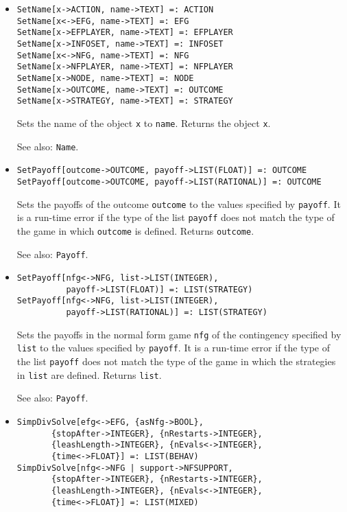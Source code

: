 \begin{itemize}
\item
\protect \large \begin{verbatim}
SetName[x->ACTION, name->TEXT] =: ACTION
SetName[x<->EFG, name->TEXT] =: EFG
SetName[x->EFPLAYER, name->TEXT] =: EFPLAYER
SetName[x->INFOSET, name->TEXT] =: INFOSET
SetName[x<->NFG, name->TEXT] =: NFG
SetName[x->NFPLAYER, name->TEXT] =: NFPLAYER
SetName[x->NODE, name->TEXT] =: NODE
SetName[x->OUTCOME, name->TEXT] =: OUTCOME
SetName[x->STRATEGY, name->TEXT] =: STRATEGY
\end{verbatim}\normalsize

\bd
Sets the name of the object \verb+x+ to \verb+name+.
Returns the object \verb+x+.
\item
[See also:] {\tt Name}.
\ed

\item
\protect \large \begin{verbatim}
SetPayoff[outcome->OUTCOME, payoff->LIST(FLOAT)] =: OUTCOME
SetPayoff[outcome->OUTCOME, payoff->LIST(RATIONAL)] =: OUTCOME
\end{verbatim}\normalsize

\bd
Sets the payoffs of the outcome \verb+outcome+ to the
values specified by \verb+payoff+.  It is a run-time error if the type
of the list \verb+payoff+ does not match the type of the game in which
\verb+outcome+ is defined.  Returns \verb+outcome+.
\item
[See also:] {\tt Payoff}.
\ed

\item
\protect \large \begin{verbatim}
SetPayoff[nfg<->NFG, list->LIST(INTEGER),
          payoff->LIST(FLOAT)] =: LIST(STRATEGY)
SetPayoff[nfg<->NFG, list->LIST(INTEGER), 
          payoff->LIST(RATIONAL)] =: LIST(STRATEGY)
\end{verbatim}\normalsize

\bd
Sets the payoffs in the normal form game \verb+nfg+ of the
contingency specified by \verb+list+ to the values specified by
\verb+payoff+.  It is a run-time error if the type of the list
\verb+payoff+ does not match the type of the game in which the
strategies in \verb+list+ are defined.  Returns \verb+list+.
\item
[See also:] {\tt Payoff}.  
\ed

\item
\protect \large \begin{verbatim}
SimpDivSolve[efg<->EFG, {asNfg->BOOL}, 
       {stopAfter->INTEGER}, {nRestarts->INTEGER}, 
       {leashLength->INTEGER}, {nEvals<->INTEGER}, 
       {time<->FLOAT}] =: LIST(BEHAV)
SimpDivSolve[nfg<->NFG | support->NFSUPPORT, 
       {stopAfter->INTEGER}, {nRestarts->INTEGER}, 
       {leashLength->INTEGER}, {nEvals<->INTEGER}, 
       {time<->FLOAT}] =: LIST(MIXED)
\end{verbatim}\normalsize


\end{itemize}
